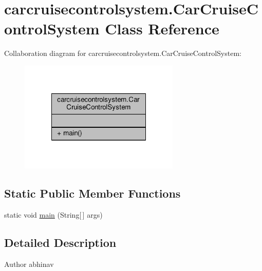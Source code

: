 \hypertarget{classcarcruisecontrolsystem_1_1CarCruiseControlSystem}{\section{carcruisecontrolsystem.\-Car\-Cruise\-Control\-System Class Reference}
\label{classcarcruisecontrolsystem_1_1CarCruiseControlSystem}
}


Collaboration diagram for carcruisecontrolsystem.\-Car\-Cruise\-Control\-System\-:
\nopagebreak
\begin{figure}[H]
\begin{center}
\leavevmode
\includegraphics[width=216pt]{classcarcruisecontrolsystem_1_1CarCruiseControlSystem__coll__graph}
\end{center}
\end{figure}
\subsection*{Static Public Member Functions}
\begin{DoxyCompactItemize}
\item 
static void \hyperlink{classcarcruisecontrolsystem_1_1CarCruiseControlSystem_a1b0191a072782fe47df5d837c2d2401f}{main} (String\mbox{[}$\,$\mbox{]} args)
\end{DoxyCompactItemize}


\subsection{Detailed Description}
\begin{DoxyAuthor}{Author}
abhinav 
\end{DoxyAuthor}


